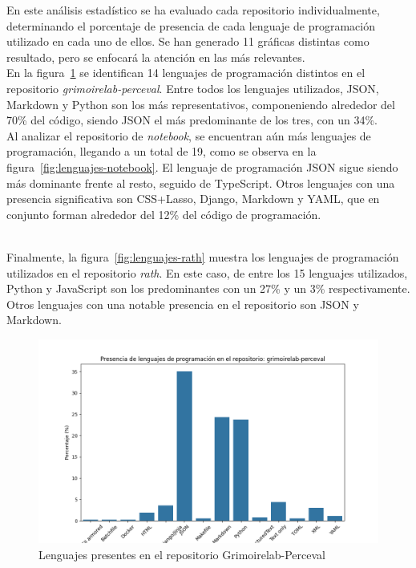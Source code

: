 \documentclass[a4paper, 12pt]{book}
\begin{document}
En este análisis estadístico se ha evaluado cada repositorio individualmente, determinando el porcentaje de presencia de cada lenguaje de programación utilizado en cada uno de ellos. Se han generado 11
gráficas distintas como resultado, pero se enfocará la atención en las más relevantes.
\\En la figura~\ref{fig:lenguajes-perceval} se identifican 14 lenguajes de programación distintos en el repositorio \textit{grimoirelab-perceval}. Entre todos los lenguajes utilizados,
JSON, Markdown y Python son los más representativos, componeniendo alrededor del 70\% del código, siendo JSON el más predominante de los tres, con un 34\%.
\\Al analizar el repositorio de \textit{notebook}, se encuentran aún más lenguajes de programación, llegando a un total de 19, como se observa en la figura~\ref{fig:lenguajes-notebook}.
El lenguaje de programación JSON sigue siendo más dominante frente al resto, seguido de TypeScript. Otros lenguajes con una presencia significativa son CSS+Lasso, Django, Markdown y YAML,
que en conjunto forman alrededor del 12\% del código de programación.

\\Finalmente, la figura~\ref{fig:lenguajes-rath} muestra los lenguajes de programación utilizados en el repositorio \textit{rath}. En este caso, de entre los 15 lenguajes utilizados, Python y 
JavaScript son los predominantes con un 27\% y un 3\% respectivamente. Otros lenguajes con una notable presencia en el repositorio son JSON y Markdown.

\begin{figure}
  \centering
  \includegraphics[width=16cm, keepaspectratio]{img/languages_grimoirelab-perceval.png}
  \caption{Lenguajes presentes en el repositorio Grimoirelab-Perceval}
  \label{fig:lenguajes-perceval}
\end{figure}
\end{document}
